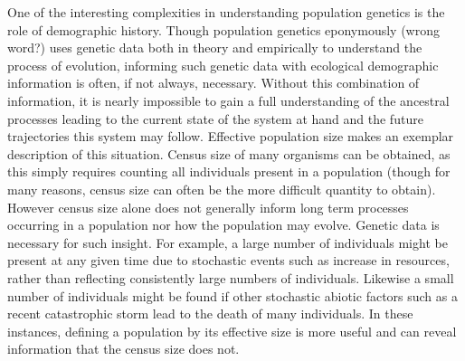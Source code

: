One of the interesting complexities in understanding population genetics is the role of demographic history. Though population genetics eponymously (\color{red}wrong word?\color{black}) uses genetic data both in theory and empirically to understand the process of evolution, informing such genetic data with ecological demographic information is often, if not always, necessary. Without this combination of information, it is nearly impossible to gain a full understanding of the ancestral processes leading to the current state of the system at hand and the future trajectories this system may follow. Effective population size makes an exemplar description of this situation. Census size of many organisms can be obtained, as this simply requires counting all individuals present in a population (though for many reasons, census size can often be the more difficult quantity to obtain). However census size alone does not generally inform long term processes occurring in a population nor how the population may evolve. Genetic data is necessary for such insight. For example, a large number of individuals might be present at any given time due to stochastic events such as increase in resources, rather than reflecting consistently large numbers of individuals. Likewise a small number of individuals might be found if other stochastic abiotic factors such as a recent catastrophic storm lead to the death of many individuals. In these instances, defining a population by its effective size is more useful and can reveal information that the census size does not. 

